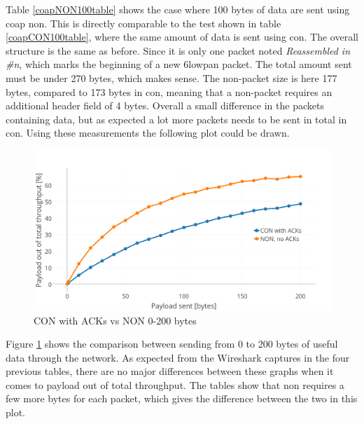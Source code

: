 \noindent Table \ref{coapNON100table} shows the case where 100 bytes of data are sent using \gls{coap} \gls{non}. This is directly comparable to the test shown in table \ref{coapCON100table}, where the same amount of data is sent using \gls{con}. The overall structure is the same as before. Since it is only one packet noted \textit{Reassembled in \#n}, which marks the beginning of a new \gls{6lowpan} packet. The total amount sent must be under 270 bytes, which makes sense. The \gls{non}-packet size is here 177 bytes, compared to 173 bytes in \gls{con}, meaning that a \gls{non}-packet requires an additional header field of 4 bytes. Overall a small difference in the packets containing data, but as expected a lot more packets needs to be sent in total in \gls{con}. Using these measurements the following plot could be drawn. 





\begin{figure}[ht]
    \centering
    \includegraphics[width=1.0\textwidth]{CONNONvs0-200acks.png}    
    \caption{CON with ACKs vs NON 0-200 bytes}
    \label{fig:CONvsNON0-200_acks}
\end{figure}

\noindent Figure \ref{fig:CONvsNON0-200_acks} shows the comparison between sending from 0 to 200 bytes of useful data through the network. As expected from the Wireshark captures in the four previous tables, there are no major differences between these graphs when it comes to payload out of total throughput. The tables show that \gls{non} requires a few more bytes for each packet, which gives the difference between the two in this plot. 



